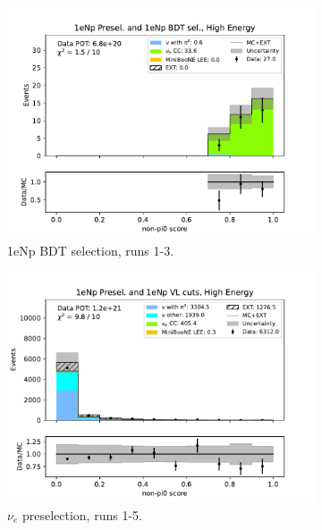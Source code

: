 \begin{figure}[H]
\begin{subfigure}{0.33\linewidth}
    \includegraphics[width=\linewidth]{technote/Sidebands/Figures/FarSideband/far_sideband_nonpi0_score_run123_NP_NPBDT_HIGH_ENERGY.pdf}
    \caption{1eNp BDT selection, runs 1-3.}
    \end{subfigure}
    \begin{subfigure}{0.33\linewidth}
    \includegraphics[width=\linewidth]{technote/Sidebands/Figures/FarSideband/far_sideband_nonpi0_score_run1234a4b4c4d5_NP_NP_HIGH_ENERGY.pdf}
    \caption{$\nu_e$ preselection, runs 1-5.}
    \end{subfigure}%
    \begin{subfigure}{0.33\linewidth}

\end{subfigure}
\end{figure}
